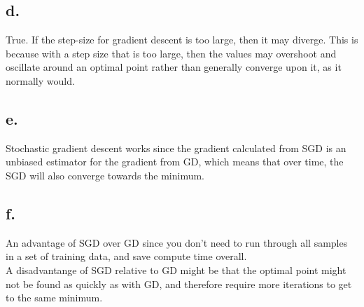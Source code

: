 \documentclass{article}
\newcommand{\1}{\mathbf{1}}
\begin{document}
{\subsection*{d.}

True. If the step-size for gradient descent is too large, then it may diverge. This is because with a step size that is too large, then the values may overshoot and oscillate around an optimal point rather than generally converge upon it, as it normally would.

\subsection*{e.}

Stochastic gradient descent works since the gradient calculated from SGD is an unbiased estimator for the gradient from GD, which means that over time, the SGD will also converge towards the minimum.

\subsection*{f.}

An advantage of SGD over GD since you don't need to run through all samples in a set of training data, and save compute time overall. \\ 
A disadvantange of SGD relative to GD might be that the optimal point might not be found as quickly as with GD, and therefore require more iterations to get to the same minimum.

}
\end{document}
